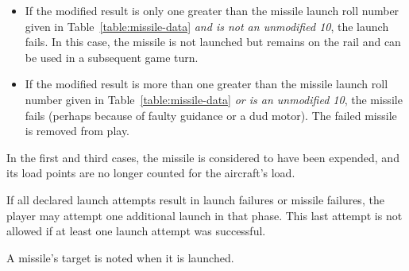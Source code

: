 {\begin{itemize}
    \item If the modified result is only one greater than the missile launch roll number given in Table~\ref{table:missile-data} \emph{and is not an unmodified 10}, the launch fails.
    In this case, the missile is not launched but remains on the rail and can be used in a subsequent game turn.

    \item If the modified result is more than one greater than the missile launch roll number given in Table~\ref{table:missile-data} \emph{or is an unmodified 10}, the missile fails (perhaps because of faulty guidance or a dud motor). The failed missile is removed from play.  


\end{itemize}

In the first and third cases, the missile is considered to have been expended, and its load points are no longer counted for the aircraft's load.

If all declared launch attempts result in launch failures or missile failures, the player may attempt one additional launch in that phase. This last attempt is not allowed if at least one launch attempt was successful. 

A missile's target is noted when it is launched.
}

